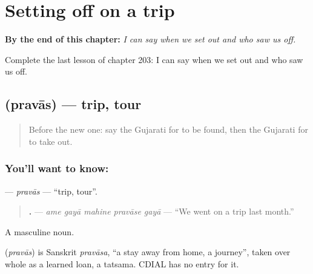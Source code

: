 
\chapter{Setting off on a trip}
\label{ch:gu-setting-off-on-a-trip}

\begin{chapteropening}
\textbf{By the end of this chapter:} \emph{I can say when we set out and who saw us off.}

Complete the last lesson of chapter 203: I can say when we set out and who saw us off.
\end{chapteropening}

\section[\texorpdfstring{\gu{પ્રવાસ} (pravās)}{પ્રવાસ (pravās)}]{ (pravās) — trip, tour}

\label{lesson:GU-C203-pravas}



\begin{quote}
Before the new one: say the Gujarati for to be found, then the Gujarati for to take out.
\end{quote}

\subsection*{You'll want to know: }
\textbf{} — \emph{pravās} — \textquotedblleft{}trip, tour\textquotedblright{}.

\begin{quote}
\textbf{    .} — \emph{ame gayā mahine pravāse gayā} — \textquotedblleft{}We went on a trip last month.\textquotedblright{}
\end{quote}

A masculine noun.

\begin{cousinweb}
\textbf{} (\emph{pravās}) is Sanskrit \emph{pravāsa}, \textquotedblleft{}a stay away from home, a journey\textquotedblright{}, taken over whole as a learned loan, a tatsama. CDIAL has no entry for it.
\end{cousinweb}

